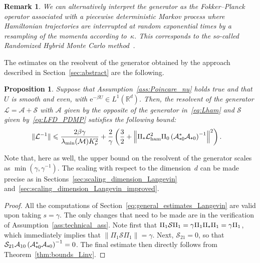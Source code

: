 \documentclass{article}
\newtheorem{prop}{Proposition}
\newtheorem{remark}{Remark}
\newcommand{\dps}{\displaystyle }
\newcommand{\rme}{\mathrm{e}}
\newcommand{\cL}{\mathcal{L}}
\newcommand{\cLs}{\mathcal{S}}
\newcommand{\cLa}{\mathcal{A}}
\newcommand{\cLham}{\mathcal{L}_{\rm ham}}
\newcommand{\R}{\mathbb{R}}
\newcommand{\subplus}{\textnormal{\texttt{+}}}
\renewcommand{\leq}{\leqslant}
\begin{document}
\begin{remark}
  We can alternatively interpret the generator as the Fokker--Planck operator associated with a piecewise deterministic Markov process where Hamiltonian trajectories are interrupted at random exponential times by a resampling of the momenta according to~$\kappa$. This corresponds to the so-called Randomized Hybrid Monte Carlo method~\cite{BRSS17}. 
\end{remark}

The estimates on the resolvent of the generator obtained by the approach described in Section~\ref{sec:abstract} are the following.

\begin{prop}
  \label{prop:RHMC}
  Suppose that Assumption~\ref{ass:Poincare_nu} holds true and that $U$ is smooth and even, with $\rme^{-\beta U} \in L^1(\R^d)$. Then, the resolvent of the generator $\cL = \cLa + \cLs$ with $\cLa$ given by the opposite of the generator in~\eqref{eq:Lham} and $\cLs$ given by~\eqref{eq:LFD_PDMP} satisfies the following bound:
  \[
    \begin{aligned}
      \|\cL^{-1}\| & \leq \frac{2\beta\gamma}{\lambda_{\rm min}(\mathcal{M}) K_\nu^2} + \frac{2}{\gamma} \left( \frac32 + \left\| \Pi_\subplus \cLham^2 \Pi_0 \left(\cLa_{\subplus 0}^*\cLa_{\subplus 0}\right)^{-1} \right\|^2 \right).
    \end{aligned}
  \]
\end{prop}

Note that, here as well, the upper bound on the resolvent of the generator scales as $\dps \min(\gamma,\gamma^{-1})$. The scaling with respect to the dimension~$d$ can be made precise as in Sections~\ref{sec:scaling_dimension_Langevin} and~\ref{sec:scaling_dimension_Langevin_improved}.

\begin{proof}
  All the computations of Section~\ref{eq:general_estimates_Langevin} are valid upon taking $s = \gamma$. The only changes that need to be made are in the verification of Assumption~\ref{ass:technical_ass}. Note first that $\Pi_1 \cLs \Pi_1 = \gamma \Pi_1 \Pi_\subplus \Pi_1 = \gamma \Pi_1$, which immediately implies that $\|\Pi_1 \cLs \Pi_1\| = \gamma$. Next, $\cLs_{21} = 0$, so that $\cLs_{21} \cLa_{10} \left(\cLa_{\subplus 0}^*\cLa_{\subplus 0}\right)^{-1} = 0$. The final estimate then directly follows from Theorem~\ref{thm:bounds_Linv}. 
\end{proof}

\end{document}
